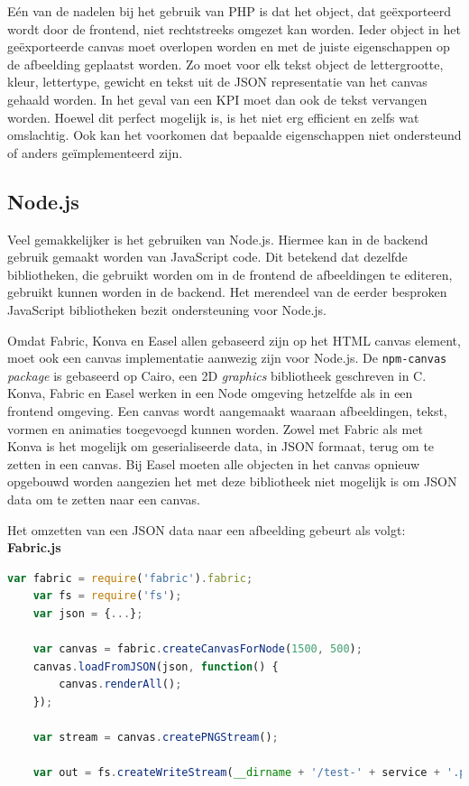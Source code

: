 E\'{e}n van de nadelen bij het gebruik van PHP is dat het object, dat ge\"{e}xporteerd wordt door de frontend, niet rechtstreeks omgezet kan worden. Ieder object in het ge\"{e}xporteerde canvas moet overlopen worden en met de juiste eigenschappen op de afbeelding geplaatst worden. Zo moet voor elk tekst object de lettergrootte, kleur, lettertype, gewicht en tekst uit de JSON representatie van het canvas gehaald worden. In het geval van een KPI moet dan ook de tekst vervangen worden. Hoewel dit perfect mogelijk is, is het niet erg efficient en zelfs wat omslachtig. Ook kan het voorkomen dat bepaalde eigenschappen niet ondersteund of anders ge\"{i}mplementeerd zijn. 

\subsection{Node.js} \label{BackendImplementationNodeJS}
Veel gemakkelijker is het gebruiken van Node.js. Hiermee kan in de backend gebruik gemaakt worden van JavaScript code. Dit betekend dat dezelfde bibliotheken, die gebruikt worden om in de frontend de afbeeldingen te editeren, gebruikt kunnen worden in de backend. Het merendeel van de eerder besproken JavaScript bibliotheken bezit ondersteuning voor Node.js. 

Omdat Fabric, Konva en Easel allen gebaseerd zijn op het HTML canvas element, moet ook een canvas implementatie aanwezig zijn voor Node.js. De \texttt{npm-canvas} \textit{package} is gebaseerd op Cairo, een 2D \textit{graphics} bibliotheek geschreven in C. %
Konva, Fabric en Easel werken in een Node omgeving hetzelfde als in een frontend omgeving. Een canvas wordt aangemaakt waaraan afbeeldingen, tekst, vormen en animaties toegevoegd kunnen worden. Zowel met Fabric als met Konva is het mogelijk om geserialiseerde data, in JSON formaat, terug om te zetten in een canvas. Bij Easel moeten alle objecten in het canvas opnieuw opgebouwd worden aangezien het met deze bibliotheek niet mogelijk is om JSON data om te zetten naar een canvas. 

Het omzetten van een JSON data naar een afbeelding gebeurt als volgt:
\textbf{Fabric.js}
\begin{lstlisting}[language=javascript]
	var fabric = require('fabric').fabric;
	var fs = require('fs');
	var json = {...};
	
	var canvas = fabric.createCanvasForNode(1500, 500);
	canvas.loadFromJSON(json, function() {
		canvas.renderAll();
	});
	
	var stream = canvas.createPNGStream();
	
	var out = fs.createWriteStream(__dirname + '/test-' + service + '.png');
\end{lstlisting}


